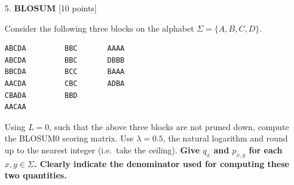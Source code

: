 \begin{enumerate}
\item[5.] \textbf{BLOSUM} [10 points]

Consider the following three blocks on the alphabet $\Sigma = \{A,B,C,D\}$.

\begin{verbatim}
ABCDA         BBC       AAAA
ABCDA         BBC       DBBB
BBCDA         BCC       BAAA
AACDA         CBC       ADBA
CBADA         BBD
AACAA
\end{verbatim}

Using $L=0$, such that the above three blocks are not pruned down, compute the BLOSUM0 scoring matrix. Use $\lambda = 0.5$, the natural logarithm and round up to the nearest integer (i.e.\ take the ceiling). \textbf{Give $q_x$ and $p_{x,y}$ for each $x,y \in \Sigma$. Clearly indicate the denominator used for computing these two quantities.}

\end{enumerate}

